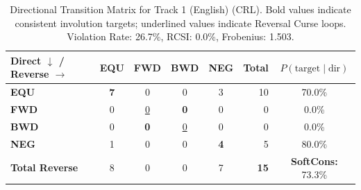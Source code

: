 \begin{table}[ht]
\centering
\small
\begin{tabular}{l|cccc|r|c}
\toprule
\textbf{Direct $\downarrow$ / Reverse $\rightarrow$} & \textbf{EQU} & \textbf{FWD} & \textbf{BWD} & \textbf{NEG} & \textbf{Total} & \textbf{$P(\text{target} \mid \text{dir})$} \\
\midrule
\textbf{EQU} & \textbf{7} & 0 & 0 & 3 & 10 & 70.0\% \\
\textbf{FWD} & 0 & \underline{0} & \textbf{0} & 0 & 0 & 0.0\% \\
\textbf{BWD} & 0 & \textbf{0} & \underline{0} & 0 & 0 & 0.0\% \\
\textbf{NEG} & 1 & 0 & 0 & \textbf{4} & 5 & 80.0\% \\
\midrule
\textbf{Total Reverse} & 8 & 0 & 0 & 7 & \textbf{15} & \textbf{SoftCons:} 73.3\% \\
\bottomrule
\end{tabular}
\caption{Directional Transition Matrix for Track 1 (English) (CRL). Bold values indicate consistent involution targets; underlined values indicate Reversal Curse loops. Violation Rate: 26.7\%, RCSI: 0.0\%, Frobenius: 1.503.}
\label{tab:transition_matrix}
\end{table}
